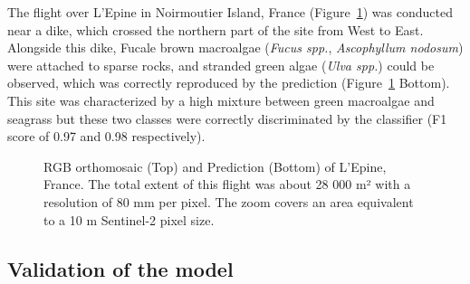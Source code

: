 \documentclass[
  letterpaper,
  11pt,
  english,
  singlespacing,
  headsepline]{MastersDoctoralThesis}
\begin{document}
\begin{spacing}{1.5}
\begin{figure}
\end{figure}%

The flight over L'Epine in Noirmoutier Island, France
(Figure~\ref{fig-Dike}) was conducted near a dike, which crossed the
northern part of the site from West to East. Alongside this dike, Fucale
brown macroalgae (\emph{Fucus spp.}, \emph{Ascophyllum nodosum}) were
attached to sparse rocks, and stranded green algae (\emph{Ulva spp.})
could be observed, which was correctly reproduced by the prediction
(Figure~\ref{fig-Dike} Bottom). This site was characterized by a high
mixture between green macroalgae and seagrass but these two classes were
correctly discriminated by the classifier (F1 score of 0.97 and 0.98
respectively).

\begin{figure}


\caption{\label{fig-Dike}RGB orthomosaic (Top) and Prediction (Bottom)
of L'Epine, France. The total extent of this flight was about 28 000 m²
with a resolution of 80 mm per pixel. The zoom covers an area equivalent
to a 10 m Sentinel-2 pixel size.}

\end{figure}%

\subsection{Validation of the model}\label{validation-of-the-model}


\end{spacing}
\end{document}
